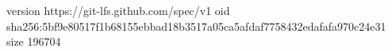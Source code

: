version https://git-lfs.github.com/spec/v1
oid sha256:5bf9e80517f1b68155ebbad18b3517a05ca5afdaf7758432edafafa970c24e31
size 196704
